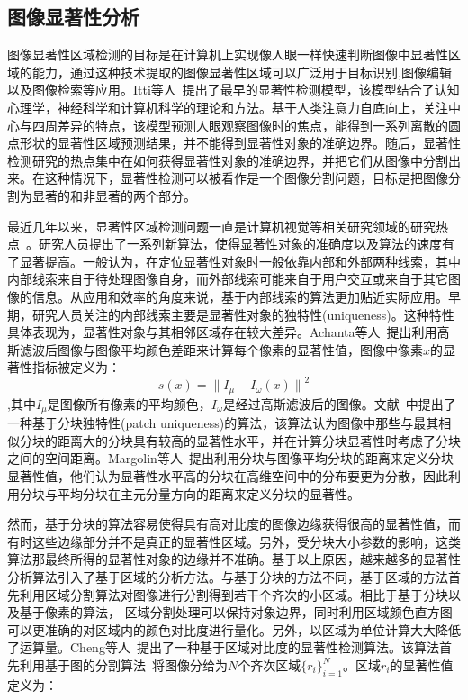 \subsection{图像显著性分析}
\label{sec:imageSaliency}
图像显著性区域检测的目标是在计算机上实现像人眼一样快速判断图像中显著性区域的能力，通过这种技术提取的图像显著性区域可以广泛用于目标识别,图像编辑以及图像检索等应用。Itti等人~\cite{itti}提出了最早的显著性检测模型，该模型结合了认知心理学，神经科学和计算机科学的理论和方法。基于人类注意力自底向上，关注中心与四周差异的特点，该模型预测人眼观察图像时的焦点，能得到一系列离散的圆点形状的显著性区域预测结果，并不能得到显著性对象的准确边界。随后，显著性检测研究的热点集中在如何获得显著性对象的准确边界，并把它们从图像中分割出来。在这种情况下，显著性检测可以被看作是一个图像分割问题，目标是把图像分割为显著的和非显著的两个部分。\par
最近几年以来，显著性区域检测问题一直是计算机视觉等相关研究领域的研究热点~\cite{saliencySurvey}。研究人员提出了一系列新算法，使得显著性对象的准确度以及算法的速度有了显著提高。一般认为，在定位显著性对象时一般依靠内部和外部两种线索\cite{saliencySurvey}，其中内部线索来自于待处理图像自身，而外部线索可能来自于用户交互或来自于其它图像的信息。从应用和效率的角度来说，基于内部线索的算法更加贴近实际应用。早期，研究人员关注的内部线索主要是显著性对象的独特性(uniqueness)。这种特性具体表现为，显著性对象与其相邻区域存在较大差异。Achanta等人~\cite{frequenyTuned}提出利用高斯滤波后图像与图像平均颜色差距来计算每个像素的显著性值，图像中像素$x$的显著性指标被定义为：
$$s(x)={\parallel I_{\mu }-I_{\omega}(x)\parallel}^{2}$$
,其中$I_{\mu }$是图像所有像素的平均颜色，$I_{\omega}$是经过高斯滤波后的图像。文献~中提出了一种基于分块独特性(patch uniqueness)的算法，该算法认为图像中那些与最其相似分块的距离大的分块具有较高的显著性水平，并在计算分块显著性时考虑了分块之间的空间距离。Margolin等人~\cite{whatmakes}提出利用分块与图像平均分块的距离来定义分块显著性值，他们认为显著性水平高的分块在高维空间中的分布要更为分散，因此利用分块与平均分块在主元分量方向的距离来定义分块的显著性。\par
然而，基于分块的算法容易使得具有高对比度的图像边缘获得很高的显著性值，而有时这些边缘部分并不是真正的显著性区域。另外，受分块大小参数的影响，这类算法那最终所得的显著性对象的边缘并不准确。基于以上原因，越来越多的显著性分析算法引入了基于区域的分析方法。与基于分块的方法不同，基于区域的方法首先利用区域分割算法对图像进行分割得到若干个齐次的小区域。相比于基于分块以及基于像素的算法， 区域分割处理可以保持对象边界，同时利用区域颜色直方图可以更准确的对区域内的颜色对比度进行量化。另外，以区域为单位计算大大降低了运算量。Cheng等人~\cite{ChengPAMI}提出了一种基于区域对比度的显著性检测算法。该算法首先利用基于图的分割算法~\cite{graphseg}将图像分给为$N$个齐次区域$\{r_{i}\}_{i=1}^{N}$。区域$r_{i}$的显著性值定义为：
